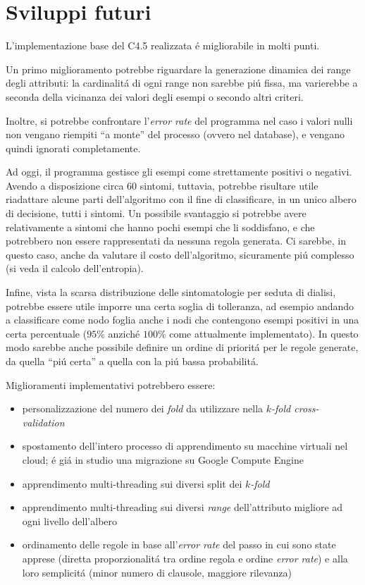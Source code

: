 \documentclass[preprint]{acm_proc_article-sp}
\begin{document}
\section{Sviluppi futuri}
\label{sviluppi-futuri}
L'implementazione base del C4.5 realizzata \'e migliorabile in molti punti.

Un primo miglioramento potrebbe riguardare la generazione dinamica dei range degli attributi: la cardinalit\'a di ogni range non sarebbe pi\'u fissa, ma varierebbe a seconda della vicinanza dei valori degli esempi o secondo altri criteri.

Inoltre, si potrebbe confrontare l'\textit{error rate} del programma nel caso i valori nulli non vengano riempiti ``a monte'' del processo (ovvero nel database), e vengano quindi ignorati completamente.

Ad oggi, il programma gestisce gli esempi come strettamente positivi o negativi. Avendo a disposizione circa $60$ sintomi, tuttavia, potrebbe risultare utile riadattare alcune parti dell'algoritmo con il fine di classificare, in un unico albero di decisione, tutti i sintomi. Un possibile svantaggio si potrebbe avere relativamente a sintomi che hanno pochi esempi che li soddisfano, e che potrebbero non essere rappresentati da nessuna regola generata. Ci sarebbe, in questo caso, anche da valutare il costo dell'algoritmo, sicuramente pi\'u complesso (si veda il calcolo dell'entropia).

Infine, vista la scarsa distribuzione delle sintomatologie per seduta di dialisi, potrebbe essere utile imporre una certa soglia di tolleranza, ad esempio andando a classificare come nodo foglia anche i nodi che contengono esempi positivi in una certa percentuale ($95\%$ anzich\'e $100\%$ come attualmente implementato). In questo modo sarebbe anche possibile definire un ordine di priorit\'a per le regole generate, da quella ``pi\'u certa'' a quella con la pi\'u bassa probabilit\'a.

Miglioramenti implementativi potrebbero essere:
\begin{itemize}
\item personalizzazione del numero dei \textit{fold} da utilizzare nella $k$\textit{-fold cross-validation}
\item spostamento dell'intero processo di apprendimento su macchine virtuali nel cloud; \'e gi\'a in studio una migrazione su Google Compute Engine
\item apprendimento multi-threading sui diversi split dei $k$\textit{-fold}
\item apprendimento multi-threading sui diversi \textit{range} dell'attributo migliore ad ogni livello dell'albero 
\item ordinamento delle regole in base all'\textit{error rate} del passo in cui sono state apprese (diretta proporzionalit\'a tra ordine regola e ordine \textit{error rate}) e alla loro semplicit\'a (minor numero di clausole, maggiore rilevanza)
\end{itemize}
\end{document}
